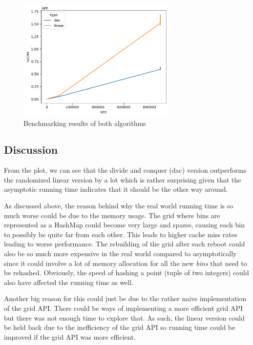 \begin{figure}[h]
	\centering
	\includegraphics[width=0.7\textwidth]{graphics/graph.png}
	\caption{Benchmarking results of both algorithms}
\end{figure}

\subsection{Discussion}

From the plot, we can see that the divide and conquer (dac) version outperforms the randomized linear version by a lot which is rather surprising given that the asymptotic running time indicates that it should be the other way around.

As discussed above, the reason behind why the real world running time is so much worse could be due to the memory usage. The grid where bins are represented as a HashMap could become very large and sparse, causing each bin to possibly be quite far from each other. This leads to higher cache miss rates leading to worse performance. The rebuilding of the grid after each reboot could also be so much more expensive in the real world compared to asymptotically since it could involve a lot of memory allocation for all the new \textit{bins} that need to be rehashed. Obviously, the speed of hashing a point (tuple of two integers) could also have affected the running time as well.

Another big reason for this could just be due to the rather naive implementation of the grid API. There could be ways of implementing a more efficient grid API but there was not enough time to explore that. As such, the linear version could be held back due to the inefficiency of the grid API so running time could be improved if the grid API was more efficient.
